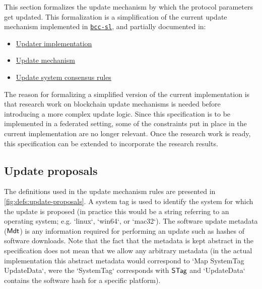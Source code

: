 This section formalizes the update mechanism by which the protocol parameters
get updated. This formalization is a simplification of the current update
mechanism implemented in
\href{https://github.com/The-Blockchain-Company/bcc-sl/}{\texttt{bcc-sl}}, and
partially documented in:
\begin{itemize}
\item \href{https://bccdocs.com/technical/updater/}{Updater implementation}
\item \href{https://bccdocs.com/bcc/update-mechanism/}{Update mechanism}
\item
  \href{https://github.com/The-Blockchain-Company/bcc-sl/blob/2a19d8ce2941b8e60f0208a5198943ec2ada1fd4/docs/block-processing/us.md}{Update system consensus rules}
\end{itemize}

The reason for formalizing a simplified version of the current implementation
is that research work on blockchain update mechanisms is needed before
introducing a more complex update logic. Since this specification is to be
implemented in a federated setting, some of the constraints put in place in the
current implementation are no longer relevant. Once the research work is ready,
this specification can be extended to incorporate the research results.

\subsection{Update proposals}
\label{sec:update-proposals}

The definitions used in the update mechanism rules are presented in
\cref{fig:defs:update-proposals}. A system tag is used to identify the system
for which the update is proposed (in practice this would be a string referring
to an operating system; e.g. `linux`, `win64`, or `mac32`). The software update
metadata ($\mathsf{Mdt}$) is any information required for performing an update
such as hashes of software downloads. Note that the fact that the metadata is
kept abstract in the specification does not mean that we allow any arbitrary
metadata (in the actual implementation this abstract metadata would correspond
to `Map SystemTag UpdateData`, were the `SystemTag` corresponds with $\mathsf{STag}$
and `UpdateData` contains the software hash for a specific platform).

